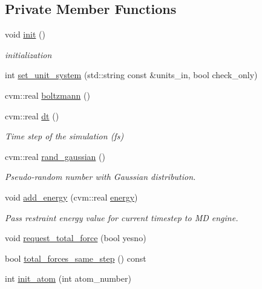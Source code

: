 \subsection*{Private Member Functions}
\begin{DoxyCompactItemize}
\item 
void \hyperlink{classcolvarproxy__tinkerhp_a9fde421f92cd67c85475a6e68d593038}{init} ()
\begin{DoxyCompactList}\small\item\em initialization \end{DoxyCompactList}\item 
int \hyperlink{classcolvarproxy__tinkerhp_a35cb6f66cad3f185fbe97486e440a978}{set\-\_\-unit\-\_\-system} (std\-::string const \&units\-\_\-in, bool check\-\_\-only)
\item 
cvm\-::real \hyperlink{classcolvarproxy__tinkerhp_a7acc624104cbe9ef60cb90fe5f51018b}{boltzmann} ()
\item 
cvm\-::real \hyperlink{classcolvarproxy__tinkerhp_a6c0fad6b6be3ac94b260262f5f06ce1b}{dt} ()
\begin{DoxyCompactList}\small\item\em Time step of the simulation (fs) \end{DoxyCompactList}\item 
cvm\-::real \hyperlink{classcolvarproxy__tinkerhp_a4dee5e31ac36857de98adfa6c74b1108}{rand\-\_\-gaussian} ()
\begin{DoxyCompactList}\small\item\em Pseudo-\/random number with Gaussian distribution. \end{DoxyCompactList}\item 
void \hyperlink{classcolvarproxy__tinkerhp_a7c99283bbb740b56e2df094a2f275e51}{add\-\_\-energy} (cvm\-::real \hyperlink{energy_8f90_a1aa8c625eb0a3eea79ed1a8047707c94}{energy})
\begin{DoxyCompactList}\small\item\em Pass restraint energy value for current timestep to M\-D engine. \end{DoxyCompactList}\item 
void \hyperlink{classcolvarproxy__tinkerhp_a3e0476b655966559d37a4fba21f6834a}{request\-\_\-total\-\_\-force} (bool yesno)
\item 
bool \hyperlink{classcolvarproxy__tinkerhp_ae9eb563f25bac7c76e358e5ce46620d5}{total\-\_\-forces\-\_\-same\-\_\-step} () const 
\item 
int \hyperlink{classcolvarproxy__tinkerhp_a68dccac4bb2fd917f2d3b5212aa627e2}{init\-\_\-atom} (int atom\-\_\-number)

\end{DoxyCompactItemize}
